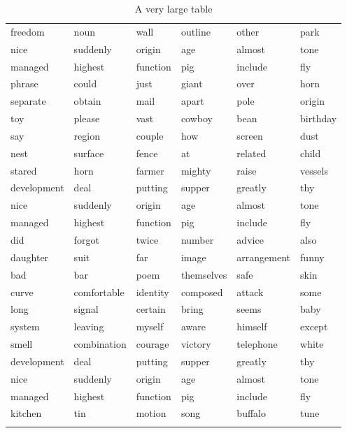 \documentclass{jcls}
\begin{document}
\begin{fullwidth}
\begin{longtable}{@{}llllll@{}}
    freedom     & noun        & wall     & outline    & other       & park      \\
    nice        & suddenly    & origin   & age        & almost      & tone      \\
    managed     & highest     & function & pig        & include     & fly       \\
    phrase      & could       & just     & giant      & over        & horn      \\
    separate    & obtain      & mail     & apart      & pole        & origin    \\
    toy         & please      & vast     & cowboy     & bean        & birthday  \\
    say         & region      & couple   & how        & screen      & dust      \\
    nest        & surface     & fence    & at         & related     & child     \\
    stared      & horn        & farmer   & mighty     & raise       & vessels   \\
    development & deal        & putting  & supper     & greatly     & thy       \\
    nice        & suddenly    & origin   & age        & almost      & tone      \\
    managed     & highest     & function & pig        & include     & fly       \\
    did         & forgot      & twice    & number     & advice      & also      \\
    daughter    & suit        & far      & image      & arrangement & funny     \\
    bad         & bar         & poem     & themselves & safe        & skin      \\
    curve       & comfortable & identity & composed   & attack      & some      \\
    long        & signal      & certain  & bring      & seems       & baby      \\
    system      & leaving     & myself   & aware      & himself     & except    \\
    smell       & combination & courage  & victory    & telephone   & white     \\
    development & deal        & putting  & supper     & greatly     & thy       \\
    nice        & suddenly    & origin   & age        & almost      & tone      \\
    managed     & highest     & function & pig        & include     & fly       \\
    kitchen     & tin         & motion   & song       & buffalo     & tune      \\
    \caption{A very large table}
  \end{longtable}
\end{fullwidth}
\end{document}
